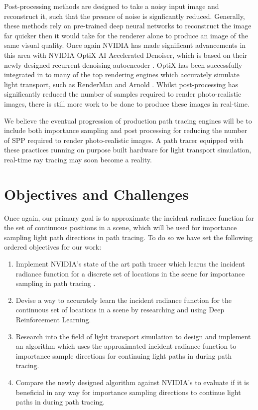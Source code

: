 \documentclass[../dissertation.tex]{subfiles}
\begin{document}
Post-processing methods are designed to take a noisy input image and reconstruct it, such that the presnce of noise is signficantly reduced. Generally, these methods rely on pre-trained deep neural networks to reconstruct the image far quicker then it would take for the renderer alone to produce an image of the same visual quality\cite{bako2017kernel}. Once again NVIDIA has made significant advancements in this area with NVIDIA OptiX AI Accelerated Denoiser, which is based on their newly designed recurrent denoising autoencoder \cite{chaitanya2017interactive}. OptiX has been successfully integrated in to many of the top rendering engines which accurately simulate light transport, such as RenderMan\cite{christensen2018renderman} and Arnold \cite{georgiev2018arnold}. Whilst post-processing has significantly reduced the number of samples required to render photo-realistic images, there is still more work to be done to produce these images in real-time.

We believe the eventual progression of production path tracing engines will be to include both importance sampling and post processing for reducing the number of SPP required to render photo-realistic images. A path tracer equipped with these practices running on purpose built hardware for light transport simulation, real-time ray tracing may soon become a reality.

\section{Objectives and Challenges}

Once again, our primary goal is to approximate the incident radiance function for the set of continuous positions in a scene, which will be used for importance sampling light path directions in path tracing. To do so we have set the following ordered objectives for our work:

\begin{enumerate}
\item Implement NVIDIA's state of the art path tracer which learns the incident radiance function for a discrete set of locations in the scene for importance sampling in path tracing \cite{dahm2017learning}.

\item Devise a way to accurately learn the incident radiance function for the continuous set of locations in a scene by researching and using Deep Reinforcement Learning.

\item Research into the field of light transport simulation to design and implement an algorithm which uses the approximated incident radiance function to importance sample directions for continuing light paths in during path tracing.

\item Compare the newly designed algorithm against NVIDIA's to evaluate if it is beneficial in any way for importance sampling directions to continue light paths in during path tracing.
\end{enumerate}
\end{document}
